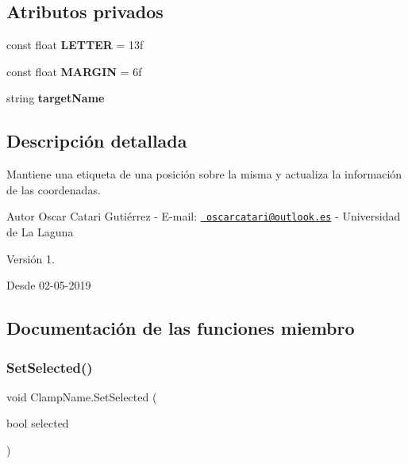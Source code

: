 \subsection*{Atributos privados}
\begin{DoxyCompactItemize}
\item 
\mbox{\label{class_clamp_name_a2ff43ba0271005b37362d7b898cee7d5}} 
const float {\bfseries L\+E\+T\+T\+ER} = 13f
\item 
\mbox{\label{class_clamp_name_a61bf13118ff2c871bdf6fbb2bef90176}} 
const float {\bfseries M\+A\+R\+G\+IN} = 6f
\item 
\mbox{\label{class_clamp_name_a285c488a8f897e1b6f355a9ea79972b1}} 
string {\bfseries target\+Name}
\end{DoxyCompactItemize}


\subsection{Descripción detallada}
Mantiene una etiqueta de una posición sobre la misma y actualiza la información de las coordenadas. \begin{DoxyAuthor}{Autor}
Oscar Catari Gutiérrez -\/ E-\/mail\+: \href{mailto:oscarcatari@outlook.es}{\texttt{ oscarcatari@outlook.\+es}} -\/ Universidad de La Laguna 
\end{DoxyAuthor}
\begin{DoxyVersion}{Versión}
1. 
\end{DoxyVersion}
\begin{DoxySince}{Desde}
02-\/05-\/2019 
\end{DoxySince}


\subsection{Documentación de las funciones miembro}
\mbox{\label{class_clamp_name_ae3850d4ccc21188089e261ab805c036b}} 
\subsubsection{\texorpdfstring{SetSelected()}{SetSelected()}}
{\footnotesize\ttfamily void Clamp\+Name.\+Set\+Selected (\begin{DoxyParamCaption}\item[{bool}]{selected }\end{DoxyParamCaption})\hspace{0.3cm}{\ttfamily [inline]}}


